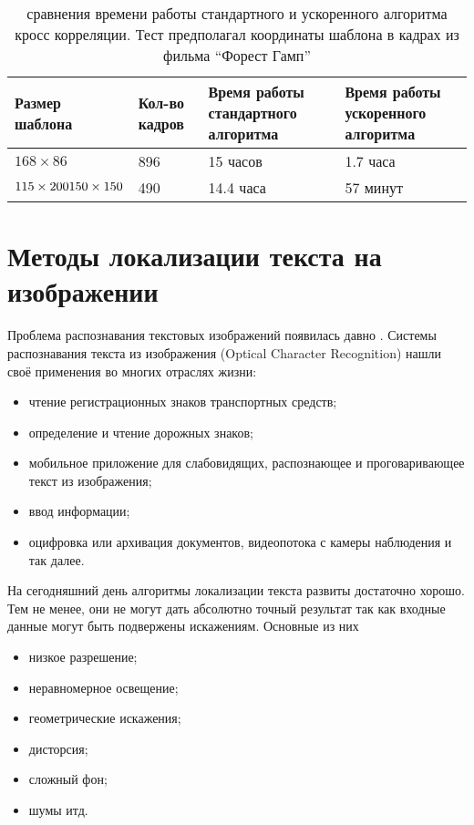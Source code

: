 \documentclass[oneside,final,14pt]{extreport}
\begin{document}
\begin{table}[H]
\caption{
сравнения времени работы стандартного и ускоренного алгоритма кросс корреляции. Тест предполагал координаты шаблона в кадрах из фильма “Форест Гамп”
}
\begin{tabularx}{\textwidth}{|X|X|X|X|}
\hline
Размер шаблона
&
Кол-во кадров
&
Время работы стандартного алгоритма
&
Время работы ускоренного алгоритма
\\
\hline
$168 \times 86$ & 896 & 15 часов & 1.7 часа 
\\
\hline
$	 115\times 200 \newline 150 \times 150 $
 & 490  &14.4 часа & 57 минут 
\\
\hline
\end{tabularx}
\end{table}

\chapter{Методы локализации текста на изображении}
Проблема распознавания текстовых изображений появилась давно \cite{JDAR_survey}. Системы распознавания текста из изображения (Optical Character Recognition) нашли своё применения во многих отраслях жизни:

\begin{itemize}
\item чтение регистрационных знаков транспортных средств;
\item определение и чтение дорожных знаков;

\item мобильное приложение для слабовидящих, распознающее и проговаривающее текст из изображения;

\item ввод информации;

\item оцифровка или архивация документов, видеопотока с камеры наблюдения и так далее.

\end{itemize}

На сегодняшний день алгоритмы локализации текста развиты достаточно хорошо. Тем не менее, они не могут дать абсолютно точный результат так как входные данные могут быть подвержены искажениям. Основные из них

\begin{itemize}

\item низкое разрешение; 

\item неравномерное освещение;

\item геометрические искажения;

\item дисторсия;

\item сложный фон;

\item шумы итд.

\end{itemize}
\end{document}
